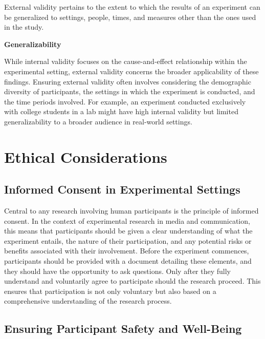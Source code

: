 \documentclass[
  b5paper]{book}
\begin{document}
External validity pertains to the extent to which the results of an experiment can be generalized to settings, people, times, and measures other than the ones used in the study.

\textbf{Generalizability}

While internal validity focuses on the cause-and-effect relationship within the experimental setting, external validity concerns the broader applicability of these findings. Ensuring external validity often involves considering the demographic diversity of participants, the settings in which the experiment is conducted, and the time periods involved. For example, an experiment conducted exclusively with college students in a lab might have high internal validity but limited generalizability to a broader audience in real-world settings.

\hypertarget{ethical-considerations-6}{%
\section{Ethical Considerations}\label{ethical-considerations-6}}

\hypertarget{informed-consent-in-experimental-settings}{%
\subsection*{Informed Consent in Experimental Settings}\label{informed-consent-in-experimental-settings}}

Central to any research involving human participants is the principle of informed consent. In the context of experimental research in media and communication, this means that participants should be given a clear understanding of what the experiment entails, the nature of their participation, and any potential risks or benefits associated with their involvement. Before the experiment commences, participants should be provided with a document detailing these elements, and they should have the opportunity to ask questions. Only after they fully understand and voluntarily agree to participate should the research proceed. This ensures that participation is not only voluntary but also based on a comprehensive understanding of the research process.

\hypertarget{ensuring-participant-safety-and-well-being}{%
\subsection*{Ensuring Participant Safety and Well-Being}\label{ensuring-participant-safety-and-well-being}}
\end{document}

